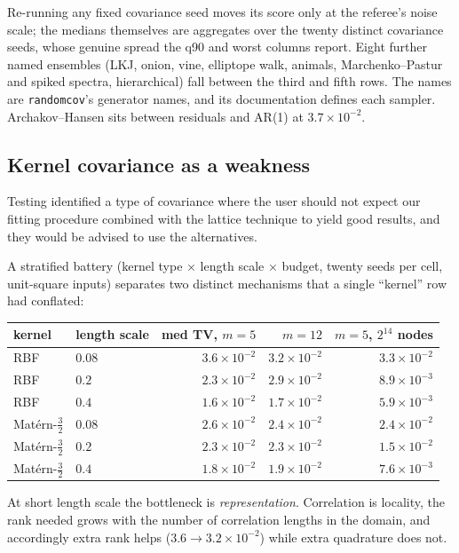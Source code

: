 \documentclass[11pt]{article}
\begin{document}
Re-running any fixed covariance seed moves its score only at the
referee's noise scale; the medians themselves are aggregates over the
twenty distinct covariance seeds, whose genuine spread the q90 and worst
columns report. Eight further named
ensembles (LKJ, onion, vine, elliptope walk, animals, Marchenko--Pastur
and spiked spectra, hierarchical) fall between the third and fifth
rows. The names are \texttt{randomcov}'s generator names, and its
documentation defines each sampler. Archakov--Hansen sits between residuals and AR(1) at $3.7\times10^{-2}$.

\subsection{Kernel covariance as a weakness}

Testing identified a type of covariance where the user should not expect our fitting procedure combined with the lattice technique to yield good results, and they would be advised to use the alternatives.

A stratified battery
(kernel type $\times$ length scale $\times$ budget, twenty seeds per
cell, unit-square inputs) separates two distinct mechanisms that a
single ``kernel'' row had conflated:

\begin{center}\small
\begin{tabular}{llrrr}
\toprule
kernel & length scale & med TV, $m{=}5$ & $m{=}12$ & $m{=}5$, $2^{14}$ nodes\\
\midrule
RBF & $0.08$ & $3.6\times10^{-2}$ & $3.2\times10^{-2}$ & $3.3\times10^{-2}$\\
RBF & $0.2$  & $2.3\times10^{-2}$ & $2.9\times10^{-2}$ & $8.9\times10^{-3}$\\
RBF & $0.4$  & $1.6\times10^{-2}$ & $1.7\times10^{-2}$ & $5.9\times10^{-3}$\\
Mat\'ern-$\tfrac32$ & $0.08$ & $2.6\times10^{-2}$ & $2.4\times10^{-2}$ & $2.4\times10^{-2}$\\
Mat\'ern-$\tfrac32$ & $0.2$  & $2.3\times10^{-2}$ & $2.3\times10^{-2}$ & $1.5\times10^{-2}$\\
Mat\'ern-$\tfrac32$ & $0.4$  & $1.8\times10^{-2}$ & $1.9\times10^{-2}$ & $7.6\times10^{-3}$\\
\bottomrule
\end{tabular}
\end{center}

At short length scale the bottleneck is \emph{representation}.
Correlation is locality, the rank needed grows with the number of
correlation lengths in the domain, and accordingly extra rank helps
($3.6\to3.2\times10^{-2}$) while extra quadrature does not.
\end{document}
